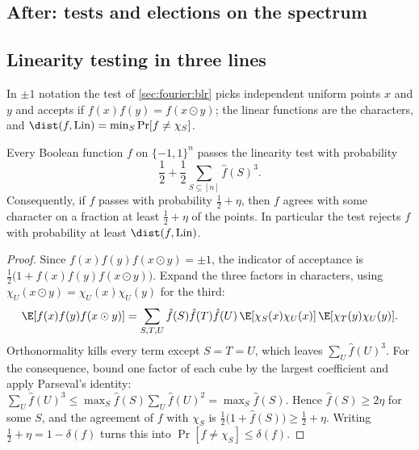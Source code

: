 \begin{refsection}
\section{After: tests and elections on the spectrum}\label{sec:fourier:after}

\subsection{Linearity testing in three lines}\label{sec:fourier:blrafter}

In $\pm1$ notation the test of \cref{sec:fourier:blr} picks independent uniform points $x$ and $y$ and accepts if $f(x)f(y)=f(x\odot y)$; the linear functions are the characters, and $\dist(f,\fourierLin)=\min_S\Pr[f\ne\chi_S]$.

\begin{theorem}\label{thm:fourier:blr}
Every Boolean function $f$ on $\{-1,1\}^n$ passes the linearity test with probability
\[
  \frac12+\frac12\sum_{S\subseteq[n]}\hat f(S)^3 .
\]
Consequently, if $f$ passes with probability $\frac12+\eta$, then $f$ agrees with some character on a fraction at least $\frac12+\eta$ of the points. In particular the test rejects $f$ with probability at least $\dist(f,\fourierLin)$.
\end{theorem}

\begin{proof}
Since $f(x)f(y)f(x\odot y)=\pm1$, the indicator of acceptance is $\frac12\bigl(1+f(x)f(y)f(x\odot y)\bigr)$. Expand the three factors in characters, using $\chi_U(x\odot y)=\chi_U(x)\chi_U(y)$ for the third:
\[
  \E[f(x)f(y)f(x\odot y)]=\sum_{S,T,U}\hat f(S)\hat f(T)\hat f(U)\,\E[\chi_S(x)\chi_U(x)]\,\E[\chi_T(y)\chi_U(y)].
\]
Orthonormality kills every term except $S=T=U$, which leaves $\sum_U\hat f(U)^3$. For the consequence, bound one factor of each cube by the largest coefficient and apply Parseval's identity: $\sum_U\hat f(U)^3\le\max_S\hat f(S)\sum_U\hat f(U)^2=\max_S\hat f(S)$. Hence $\hat f(S)\ge2\eta$ for some $S$, and the agreement of $f$ with $\chi_S$ is $\frac12\bigl(1+\hat f(S)\bigr)\ge\frac12+\eta$. Writing $\frac12+\eta=1-\delta(f)$ turns this into $\Pr[f\ne\chi_S]\le\delta(f)$.
\end{proof}


\end{refsection}
